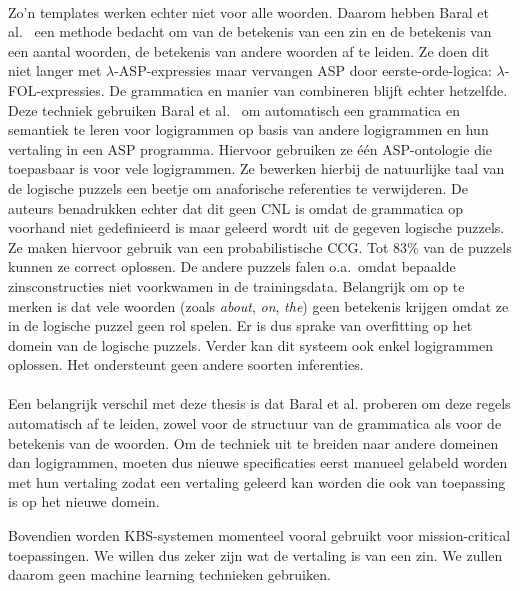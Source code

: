 \paragraph{}Zo'n templates werken echter niet voor alle woorden. Daarom hebben Baral et al.\ \cite{Baral2012} een methode bedacht om van de betekenis van een zin en de betekenis van een aantal woorden, de betekenis van andere woorden af te leiden. Ze doen dit niet langer met $\lambda$-ASP-expressies maar vervangen ASP door eerste-orde-logica: $\lambda$-FOL-expressies. De grammatica en manier van combineren blijft echter hetzelfde. Deze techniek gebruiken Baral et al.\ \cite{Baral2012a} om automatisch een grammatica en semantiek te leren voor logigrammen op basis van andere logigrammen en hun vertaling in een ASP programma. Hiervoor gebruiken ze \'e\'en ASP-ontologie die toepasbaar is voor vele logigrammen. Ze bewerken hierbij de natuurlijke taal van de logische puzzels een beetje om anaforische referenties te verwijderen. De auteurs benadrukken echter dat dit geen CNL is omdat de grammatica op voorhand niet gedefinieerd is maar geleerd wordt uit de gegeven logische puzzels. Ze maken hiervoor gebruik van een probabilistische CCG. Tot 83\% van de puzzels kunnen ze correct oplossen. De andere puzzels falen o.a.\ omdat bepaalde zinsconstructies niet voorkwamen in de trainingsdata. Belangrijk om op te merken is dat vele woorden (zoals \textit{about}, \textit{on}, \textit{the}) geen betekenis krijgen omdat ze in de logische puzzel geen rol spelen. Er is dus sprake van overfitting op het domein van de logische puzzels. Verder kan dit systeem ook enkel logigrammen oplossen. Het ondersteunt geen andere soorten inferenties.

\paragraph{} Een belangrijk verschil met deze thesis is dat Baral et al. proberen om deze regels automatisch af te leiden, zowel voor de structuur van de grammatica als voor de betekenis van de woorden. Om de techniek uit te breiden naar andere domeinen dan logigrammen, moeten dus nieuwe specificaties eerst manueel gelabeld worden met hun vertaling zodat een vertaling geleerd kan worden die ook van toepassing is op het nieuwe domein.

Bovendien worden KBS-systemen momenteel vooral gebruikt voor mission-critical toepassingen. We willen dus zeker zijn wat de vertaling is van een zin. We zullen daarom geen machine learning technieken gebruiken.
